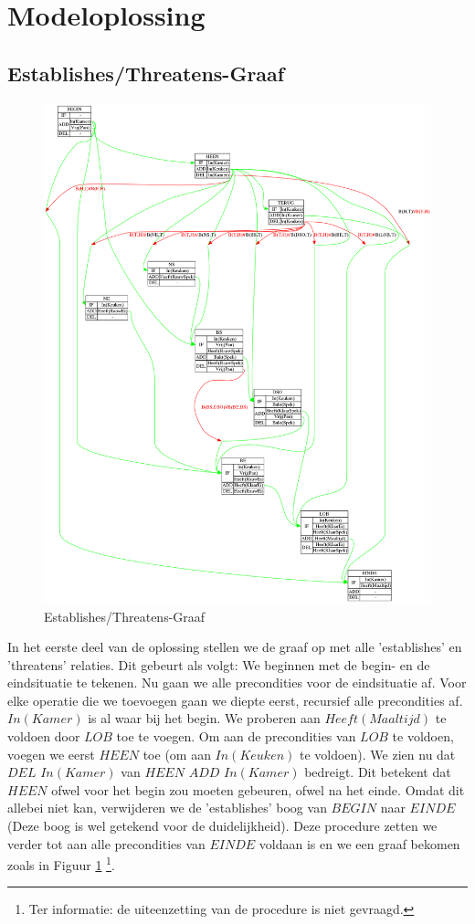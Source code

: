 \documentclass[alternative-exam.tex]{subfiles}
\begin{document}
\section{Modeloplossing}
\subsection{Establishes/Threatens-Graaf}
\begin{figure}[p]
\centering
\caption{Establishes/Threatens-Graaf}
\label{strips_1}
\includegraphics[scale=0.25]{resources/graphs/strips_1.png}
\end{figure}
In het eerste deel van de oplossing stellen we de graaf op met alle 'establishes' en 'threatens' relaties. Dit gebeurt als volgt: We beginnen met de begin- en de eindsituatie te tekenen. Nu gaan we alle precondities voor de eindsituatie af. Voor elke operatie die we toevoegen gaan we diepte eerst, recursief alle precondities af. $In(Kamer)$ is al waar bij het begin. We proberen aan $Heeft(Maaltijd)$ te voldoen door $LOB$ toe te voegen. Om aan de precondities van $LOB$ te voldoen, voegen we eerst $HEEN$ toe (om aan $In(Keuken)$ te voldoen). We zien nu dat $DEL$ $In(Kamer)$ van $HEEN$ $ADD$ $In(Kamer)$ bedreigt. Dit betekent dat $HEEN$ ofwel voor het begin zou moeten gebeuren, ofwel na het einde. Omdat dit allebei niet kan, verwijderen we de 'establishes' boog van $BEGIN$ naar $EINDE$ (Deze boog is wel getekend voor de duidelijkheid). Deze procedure zetten we verder tot aan alle precondities van $EINDE$ voldaan is en we een graaf bekomen zoals in Figuur \ref{strips_1} \footnote{Ter informatie: de uiteenzetting van de procedure is niet gevraagd.}.
\end{document}
